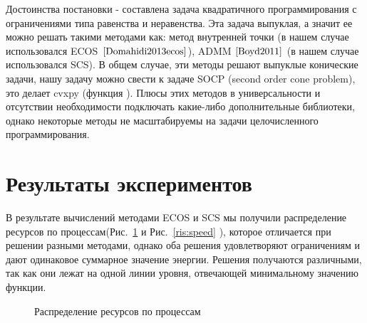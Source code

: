 \documentclass{article}
\begin{document}
Достоинства постановки - составлена задача квадратичного программирования с ограничениями типа равенства и неравенства. Эта задача выпуклая, а значит ее можно решать такими методами как: метод внутренней точки (в нашем случае использовался ECOS $\cite{Domahidi2013ecos}$), ADMM $\cite{Boyd2011}$ (в нашем случае использовался SCS). В общем случае, эти методы решают выпуклые конические задачи, нашу задачу можно свести к задаче SOCP (second order cone problem), это делает cvxpy (функция ). Плюсы этих методов в универсальности и отсутствии необходимости подключать какие-либо дополнительные библиотеки, однако некоторые методы не масштабируемы на задачи целочисленного программирования. \\

\section{Результаты экспериментов}

В результате вычислений методами ECOS и SCS мы получили распределение ресурсов по процессам(Рис.~\ref{ris:pow} и Рис.~\ref{ris:speed} ), которое  отличается при решении разными методами, однако оба решения удовлетворяют ограничениям и дают одинаковое суммарное значение энергии. Решения получаются различными, так как они лежат на одной линии уровня, отвечающей минимальному значению функции.\\

\begin{figure}[h]
\caption{Распределение ресурсов по процессам}
\label{ris:pow}
\end{figure}
\end{document}
